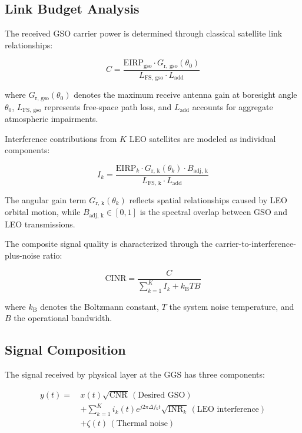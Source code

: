 \documentclass[conference]{IEEEtran}
\begin{document}
\subsection{Link Budget Analysis}
The received GSO carrier power is determined through classical satellite link relationships:

\begin{equation}
    C = \frac{\text{EIRP}_{\text{gso}} \cdot G_{\text{r, gso}}(\theta_0)}{L_{\text{FS, gso}} \cdot L_{\text{add}}}
    \label{eq:carrier_power}
\end{equation}

where $G_{\text{r, gso}}(\theta_0)$ denotes the maximum receive antenna gain at boresight angle $\theta_0$, $L_{\text{FS, gso}}$ represents free-space path loss, and $L_{\text{add}}$ accounts for aggregate atmospheric impairments.

Interference contributions from $K$ LEO satellites are modeled as individual components:

\begin{equation}
    I_k = \frac{\text{EIRP}_k \cdot G_{\text{r, k}}(\theta_k) \cdot B_{\text{adj, k}}}{L_{\text{FS, k}} \cdot L_{\text{add}}}
    \label{eq:interference_power}
\end{equation}

The angular gain term $G_{\text{r, k}}(\theta_k)$ reflects spatial relationships caused by LEO orbital motion, while $B_{\text{adj, k}} \in [0,1]$ is the spectral overlap between GSO and LEO transmissions.

The composite signal quality is characterized through the carrier-to-interference-plus-noise ratio:

\begin{equation}
    \text{CINR} = \frac{C}{\sum_{k=1}^{K}I_k + k_{\text{B}}TB}
    \label{eq:CINR}
\end{equation}

where $k_{\text{B}}$ denotes the Boltzmann constant, $T$ the system noise temperature, and $B$ the operational bandwidth.

\subsection{Signal Composition}
The signal received by physical layer at the GGS has three components:

\begin{align}
    y(t) =\, & x(t)\sqrt{\text{CNR}}\, (\text{Desired GSO}) \nonumber                                                 \\[0.5em]
             & + \sum_{k=1}^{K} i_k(t)e^{j2\pi \Delta f_k t}\sqrt{\text{INR}_k}\, (\text{LEO interference}) \nonumber \\[0.5em]
             & + \zeta(t)\, (\text{Thermal noise})
\end{align}
\end{document}
